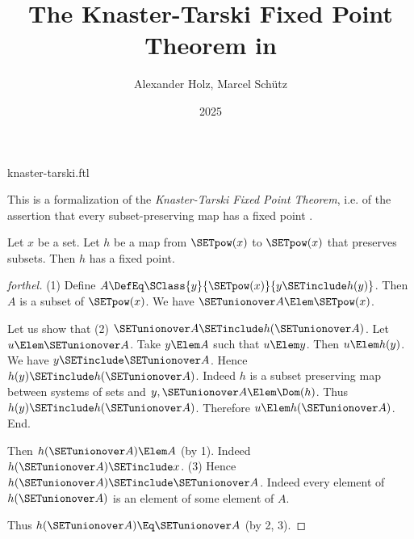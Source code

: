 \documentclass{stex}
\title{The Knaster-Tarski Fixed Point Theorem in \Naproche}
\author{Alexander Holz, Marcel Schütz}
\date{2025}
\begin{document}
\begin{smodule}{knaster-tarski.ftl}
\maketitle



\noindent This is a formalization of the \textit{Knaster-Tarski Fixed Point
Theorem}, i.e. of the assertion that every subset-preserving map has a fixed
point \cite{Schroeder2012}.

\begin{theorem}[forthel,title=Knaster-Tarski,name=Knaster-Tarski]
  Let $x$ be a set.
  Let $h$ be a map from $\SETpow(x)$ to $\SETpow(x)$ that preserves subsets.
  Then $h$ has a fixed point.
\end{theorem}
\begin{proof}[forthel]
  (1) Define $A \DefEq \SClass{y}{\SETpow(x)}{y \SETinclude h(y)}$.
  Then $A$ is a subset of $\SETpow(x)$.
  We have $\SETunionover A \Elem \SETpow(x)$.

  Let us show that (2) $\SETunionover A \SETinclude h(\SETunionover A)$.
    Let $u \Elem \SETunionover A$.
    Take $y \Elem A$ such that $u \Elem y$.
    Then $u \Elem h(y)$.
    We have $y \SETinclude \SETunionover A$.
    Hence $h(y) \SETinclude h(\SETunionover A)$.
    Indeed $h$ is a subset preserving map between systems of sets and $y, \SETunionover A \Elem \Dom(h)$.
    Thus $h(y) \SETinclude h(\SETunionover A)$.
    Therefore $u \Elem h(\SETunionover A)$.
  End.

  Then $h(\SETunionover A) \Elem A$ (by 1).
  Indeed $h(\SETunionover A) \SETinclude x$.
  (3) Hence $h(\SETunionover A) \SETinclude \SETunionover A$.
  Indeed every element of $h(\SETunionover A)$ is an element of some element of
  $A$.

  Thus $h(\SETunionover A) \Eq \SETunionover A$ (by 2, 3).
\end{proof}


\printbibliography
{}
\end{smodule}
\end{document}
